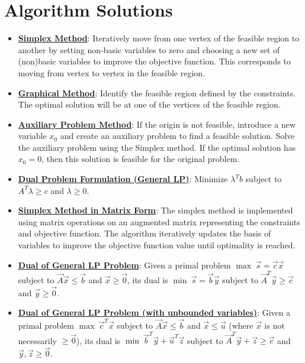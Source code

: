 \documentclass{article}%
\begin{document}
\section{Algorithm Solutions}%
\label{sec:AlgorithmSolutions}%
\begin{itemize}[leftmargin=*]%
\item \href{https://www.math.purdue.edu/~yipn/421/2024-08-27-ExSimplex.pdf#page=6}{\textbf{Simplex Method}}: Iteratively move from one vertex of the feasible region to another by setting non-basic variables to zero and choosing a new set of (non)basic variables to improve the objective function. This corresponds to moving from vertex to vertex in the feasible region.%
\item \href{https://www.math.purdue.edu/~yipn/421/2024-08-27-ExSimplex.pdf#page=4}{\textbf{Graphical Method}}: Identify the feasible region defined by the constraints. The optimal solution will be at one of the vertices of the feasible region.%
\item \href{https://www.math.purdue.edu/~yipn/421/2024-08-27-ExSimplex.pdf#page=32}{\textbf{Auxiliary Problem Method}}: If the origin is not feasible, introduce a new variable  $x_0$ and create an auxiliary problem to find a feasible solution. Solve the auxiliary problem using the Simplex method. If the optimal solution has $x_0 = 0$, then this solution is feasible for the original problem.%
\item \href{https://www.math.purdue.edu/~yipn/421/2024-09-17-DualityGeneral.pdf#page=12}{\textbf{Dual Problem Formulation (General LP)}}: Minimize $\lambda^Tb$ subject to $A^T\lambda \ge c$ and $\lambda \ge 0$.%
\item \href{https://www.math.purdue.edu/~yipn/421/2024-09-24-SimplexMatrix.pdf#page=3}{\textbf{Simplex Method in Matrix Form}}: The simplex method is implemented using matrix operations on an augmented matrix representing the constraints and objective function. The algorithm iteratively updates the basis of variables to improve the objective function value until optimality is reached.%
\item \href{https://www.math.purdue.edu/~yipn/421/2024-10-01-DualGeneralLP.pdf#page=1}{\textbf{Dual of General LP Problem}}: Given a primal problem $\max \ \vec{s} = \vec{c} \vec{x}$ subject to $\vec{A} \vec{x} \le \vec{b}$ and $\vec{x} \ge \vec{0}$, its dual is $\min \ \vec{s} = \vec{b} \vec{y}$ subject to $\vec{A}^T \vec{y} \ge \vec{c}$ and $\vec{y} \ge \vec{0}$.%
\item \href{https://www.math.purdue.edu/~yipn/421/2024-10-01-DualGeneralLP.pdf#page=3}{\textbf{Dual of General LP Problem (with unbounded variables)}}: Given a primal problem $\max \ \vec{c}^T \vec{x}$ subject to $\vec{A} \vec{x} \le \vec{b}$ and $\vec{x} \le \vec{u}$ (where $\vec{x}$ is not necessarily $\ge \vec{0}$), its dual is $\min \ \vec{b}^T \vec{y} + \vec{u}^T \vec{z}$ subject to $\vec{A}^T \vec{y} + \vec{z} \ge \vec{c}$ and $\vec{y}, \vec{z} \ge \vec{0}$.%

\end{itemize}
\end{document}
